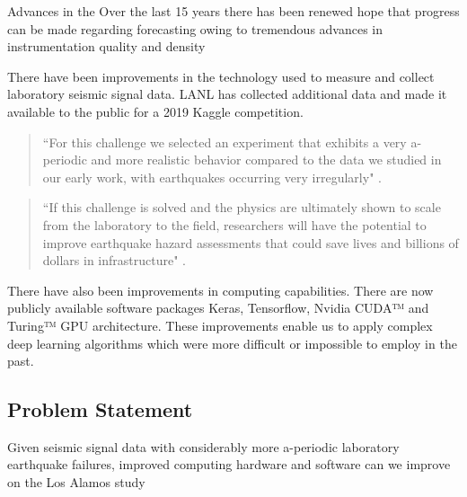 \documentclass[]{llncs}
\begin{document}

Advances in the Over the last 15 years there has been renewed hope that progress can be made regarding forecasting owing to tremendous advances in instrumentation quality and density %

There have been improvements in the technology used to measure and collect laboratory seismic signal data. LANL has collected additional data and made it available to the public for a 2019 Kaggle competition. \par

\begin{quote}
	“For this challenge we selected an experiment that exhibits a very a-periodic and more realistic behavior compared to the data we studied in our early work, with earthquakes occurring very irregularly" \cite{kaggle}. 
\end{quote}

\begin{quote}
	“If this challenge is solved and the physics are ultimately shown to scale from the laboratory to the field, researchers will have the potential to improve earthquake hazard assessments that could save lives and billions of dollars in infrastructure" \cite{kaggle}.
\end{quote}

There have also been improvements in computing capabilities. There are now publicly available software packages Keras, Tensorflow, Nvidia CUDA™ and Turing™ GPU architecture. These improvements enable us to apply complex deep learning algorithms which were more difficult or impossible to employ in the past.\par

\subsection{Problem Statement}

Given seismic signal data with considerably more a-periodic laboratory earthquake failures, improved computing hardware and software can we improve on the Los Alamos study %
\end{document}
